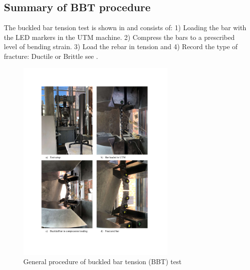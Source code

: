 \subsection{Summary of BBT procedure}

The buckled bar tension test is shown in  and consists of: 1) Loading the bar with the LED markers in the UTM machine. 2) Compress the bars to a prescribed level of bending strain. 3) Load the rebar in tension and  4) Record the type of fracture: Ductile or Brittle see . 

\begin{figure}[htbp]
	\centering
	\includegraphics[width=0.7\textwidth]{VAC Thesis 2.0/Chapter-4/figs/BBT Procedure.pdf}
	\caption{General procedure of buckled bar tension (BBT) test}
	\label{fig:BBT_Test_Summary}
\end{figure}

